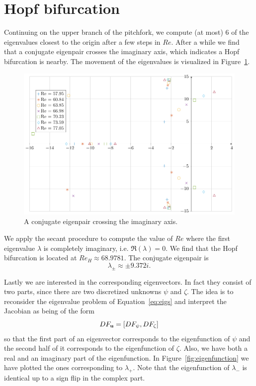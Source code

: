 \section{Hopf bifurcation}

Continuing on the upper branch of the pitchfork, we compute (at most) 6 of the eigenvalues closest to the origin after a few steps in $Re.$ After a while we find that a conjugate eigenpair crosses the imaginary axis, which indicates a Hopf bifurcation is nearby. The movement of the eigenvalues is visualized in Figure~\ref{fig:eigenpair_crossing_imag}.

\begin{figure}[h]
  \centerline{\includegraphics{images/eigenwaarden_hopf.pdf}}
  \caption{A conjugate eigenpair crossing the imaginary axis.}
  \label{fig:eigenpair_crossing_imag}
\end{figure}

We apply the secant procedure to compute the value of $Re$ where the first eigenvalue $\lambda$ is completely imaginary, i.e. $\Re(\lambda) = 0.$ We find that the Hopf bifurcation is located at $Re_H \approx 68.9781.$ The conjugate eigenpair is $$\lambda_\pm \approx \pm 9.372i.$$

Lastly we are interested in the corresponding eigenvectors. In fact they consist of two parts, since there are two discretized unknowns $\psi$ and $\zeta.$ The idea is to reconsider the eigenvalue problem of Equation~\eqref{eq:eigs} and interpret the Jacobian as being of the form
\begin{equation}
    DF_{\mathbf{u}} = [DF_{\mathbf{\psi}}, DF_{\mathbf{\zeta}}]
\end{equation}
so that the first part of an eigenvector corresponds to the eigenfunction of $\psi$ and the second half of it corresponds to the eigenfunction of $\zeta.$ Also, we have both a real and an imaginary part of the eigenfunction. In Figure~\ref{fig:eigenfunction} we have plotted the ones corresponding to $\lambda_+.$ Note that the eigenfunction of $\lambda_-$ is identical up to a sign flip in the complex part.


